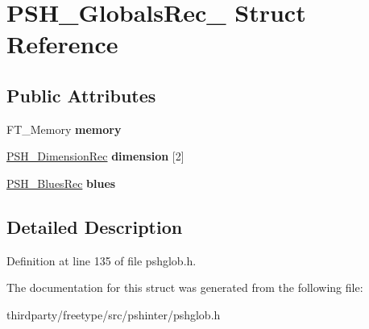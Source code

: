 \hypertarget{struct_p_s_h___globals_rec__}{}\section{P\+S\+H\+\_\+\+Globals\+Rec\+\_\+ Struct Reference}
\label{struct_p_s_h___globals_rec__}
\subsection*{Public Attributes}
\begin{DoxyCompactItemize}
\item 
\mbox{\label{struct_p_s_h___globals_rec___a054764c4019f0d5f2bb4ada22cabe529}} 
F\+T\+\_\+\+Memory {\bfseries memory}
\item 
\mbox{\label{struct_p_s_h___globals_rec___ad15bac2511207d8e4bda122b39bd29fd}} 
\hyperlink{struct_p_s_h___dimension_rec__}{P\+S\+H\+\_\+\+Dimension\+Rec} {\bfseries dimension} \mbox{[}2\mbox{]}
\item 
\mbox{\label{struct_p_s_h___globals_rec___a733fc6d08bb12a7610c2e4e766c4cc25}} 
\hyperlink{struct_p_s_h___blues_rec__}{P\+S\+H\+\_\+\+Blues\+Rec} {\bfseries blues}
\end{DoxyCompactItemize}


\subsection{Detailed Description}


Definition at line 135 of file pshglob.\+h.



The documentation for this struct was generated from the following file\+:\begin{DoxyCompactItemize}
\item 
thirdparty/freetype/src/pshinter/pshglob.\+h\end{DoxyCompactItemize}
